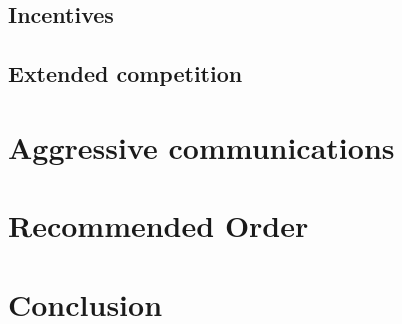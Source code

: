 \documentclass[11pt]{article}
\begin{document}
\subsection{Incentives}

\subsection{Extended competition}

\section{Aggressive communications}


\section{Recommended Order}

\section{Conclusion}





%
%
\end{document}
